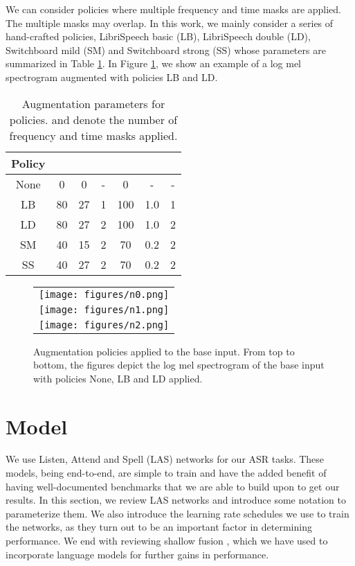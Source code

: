 \documentclass[a4paper]{article}
\begin{document}
We can consider policies where multiple frequency and time masks are applied. The multiple masks may overlap. In this work, we mainly consider a series of hand-crafted policies, LibriSpeech basic (LB), LibriSpeech double (LD), Switchboard mild (SM) and Switchboard strong (SS) whose parameters are summarized in Table \ref{t:policies}. In Figure \ref{fig:policies}, we show an example of a log mel spectrogram augmented with policies LB and LD.

\begin{table}[h]
  \caption{Augmentation parameters for policies.  and  denote the number of frequency and time masks applied.}
  \label{t:policies}
  \centering
  \footnotesize
  \begin{tabular}{ccccccc}
    \toprule
    Policy &  &  &  &  &  &  \\
    \midrule
    None & 0 & 0 & - & 0 & - & - \\
    LB & 80 & 27 & 1 & 100 & 1.0 & 1\\
    LD & 80 & 27 & 2 & 100 & 1.0 & 2 \\
    SM & 40 & 15 & 2 & 70 & 0.2 & 2\\
    SS & 40 & 27 & 2 & 70 & 0.2 & 2\\
    \bottomrule
  \end{tabular}
  \vskip -0.1in
\end{table}

\begin{figure}[t]
  \centering
  \begin{tabular}{c}
  \texttt{[image: figures/n0.png]} \\
  \texttt{[image: figures/n1.png]} \\
  \texttt{[image: figures/n2.png]}
  \end{tabular}
  \vskip -0.05in
  \caption{Augmentation policies applied to the base input. From top to bottom, the figures depict the log mel spectrogram of the base input with policies None, LB and LD applied.}
  \label{fig:policies}
  \vskip -0.15in
\end{figure}

\section{Model}

We use Listen, Attend and Spell (LAS) networks \cite{Chan2016ListenAA} for our ASR tasks. These models, being end-to-end, are simple to train and have the added benefit of having well-documented benchmarks \cite{zeyer-interspeech-2018, irie-arxiv-2019} that we are able to build upon to get our results. In this section, we review LAS networks and introduce some notation to parameterize them. We also introduce the learning rate schedules we use to train the networks, as they turn out to be an important factor in determining performance. We end with reviewing shallow fusion \cite{gulcehre-2015-arxiv}, which we have used to incorporate language models for further gains in performance.
\end{document}
